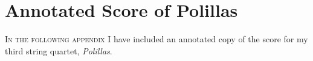 \chapter{Annotated Score of Polillas}
\label{AppendixF}

\lettrine[lines=2,slope=-2pt,nindent=2pt]{\textcolor{SchoolColor}{I}}{n the following appendix} I have included an annotated copy of the score for my third string quartet, \textit{Polillas}.


